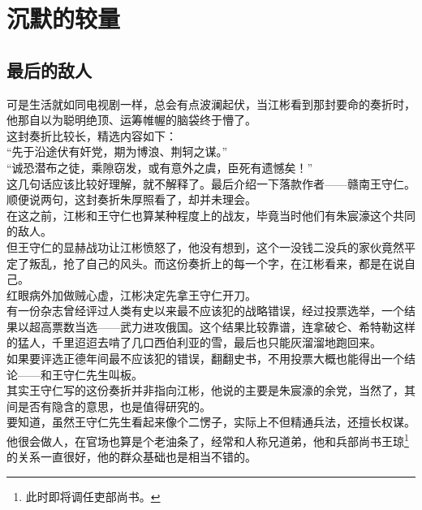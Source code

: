 \section{沉默的较量}
\ifnum{}
	\begin{multicols}{\theparacolNo}
\fi
\subsection{最后的敌人}
可是生活就如同电视剧一样，总会有点波澜起伏，当江彬看到那封要命的奏折时，他那自以为聪明绝顶、运筹帷幄的脑袋终于懵了。\\

这封奏折比较长，精选内容如下：\\

“先于沿途伏有奸党，期为博浪、荆轲之谋。”\\

“诚恐潜布之徒，乘隙窃发，或有意外之虞，臣死有遗憾矣！”\\

这几句话应该比较好理解，就不解释了。最后介绍一下落款作者——赣南王守仁。\\

顺便说两句，这封奏折朱厚照看了，却并未理会。\\

在这之前，江彬和王守仁也算某种程度上的战友，毕竟当时他们有朱宸濠这个共同的敌人。\\

但王守仁的显赫战功让江彬愤怒了，他没有想到，这个一没钱二没兵的家伙竟然平定了叛乱，抢了自己的风头。而这份奏折上的每一个字，在江彬看来，都是在说自己。\\

红眼病外加做贼心虚，江彬决定先拿王守仁开刀。\\

有一份杂志曾经评过人类有史以来最不应该犯的战略错误，经过投票选举，一个结果以超高票数当选——武力进攻俄国。这个结果比较靠谱，连拿破仑、希特勒这样的猛人，千里迢迢去啃了几口西伯利亚的雪，最后也只能灰溜溜地跑回来。\\

如果要评选正德年间最不应该犯的错误，翻翻史书，不用投票大概也能得出一个结论——和王守仁先生叫板。\\

其实王守仁写的这份奏折并非指向江彬，他说的主要是朱宸濠的余党，当然了，其间是否有隐含的意思，也是值得研究的。\\

要知道，虽然王守仁先生看起来像个二愣子，实际上不但精通兵法，还擅长权谋。他很会做人，在官场也算是个老油条了，经常和人称兄道弟，他和兵部尚书王琼\footnote{此时即将调任吏部尚书。}的关系一直很好，他的群众基础也是相当不错的。\\


\end{multicols}
